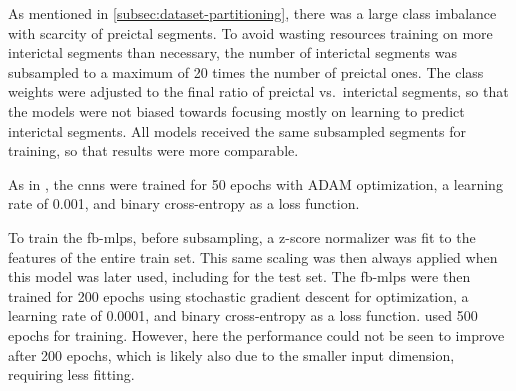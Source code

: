 As mentioned in \cref{subsec:dataset-partitioning}, there was a large class imbalance with scarcity of preictal segments.
To avoid wasting resources training on more interictal segments than necessary, the number of interictal segments was subsampled to a maximum of 20 times the number of preictal ones.
The class weights were adjusted to the final ratio of preictal vs.\ interictal segments, so that the models were not biased towards focusing mostly on learning to predict interictal segments.
All models received the same subsampled segments for training, so that results were more comparable.

As in \textcite{eberlein_convolutional_2018}, the \glspl{cnn} were trained for 50 epochs with ADAM optimization, a learning rate of \num{0.001}, and binary cross-entropy as a loss function.

To train the \glspl{fb-mlp}, before subsampling, a z-score normalizer was fit to the features of the entire train set.
This same scaling was then always applied when this model was later used, including for the test set.
The \glspl{fb-mlp} were then trained for 200 epochs using stochastic gradient descent for optimization, a learning rate of \num{0.0001}, and binary cross-entropy as a loss function.
\Textcite{muller_coherent_2022} used 500 epochs for training.
However, here the performance could not be seen to improve after 200 epochs, which is likely also due to the smaller input dimension, requiring less fitting.
